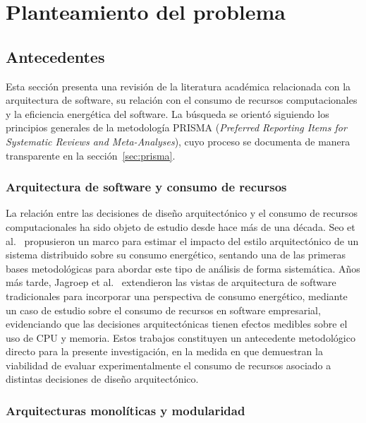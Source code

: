 \chapter{Planteamiento del problema}
\label{cap:planteamiento}

\section{Antecedentes}
\label{sec:antecedentes}

Esta sección presenta una revisión de la literatura académica relacionada con la arquitectura de software, su relación con el consumo de recursos computacionales y la eficiencia energética del software. La búsqueda se orientó siguiendo los principios generales de la metodología PRISMA (\textit{Preferred Reporting Items for Systematic Reviews and Meta-Analyses}), cuyo proceso se documenta de manera transparente en la sección~\ref{sec:prisma}.

\subsection{Arquitectura de software y consumo de recursos}

La relación entre las decisiones de diseño arquitectónico y el consumo de recursos computacionales ha sido objeto de estudio desde hace más de una década. Seo et al.~\cite{seo2008framework} propusieron un marco para estimar el impacto del estilo arquitectónico de un sistema distribuido sobre su consumo energético, sentando una de las primeras bases metodológicas para abordar este tipo de análisis de forma sistemática. Años más tarde, Jagroep et al.~\cite{jagroep2017extending} extendieron las vistas de arquitectura de software tradicionales para incorporar una perspectiva de consumo energético, mediante un caso de estudio sobre el consumo de recursos en software empresarial, evidenciando que las decisiones arquitectónicas tienen efectos medibles sobre el uso de CPU y memoria. Estos trabajos constituyen un antecedente metodológico directo para la presente investigación, en la medida en que demuestran la viabilidad de evaluar experimentalmente el consumo de recursos asociado a distintas decisiones de diseño arquitectónico.

\subsection{Arquitecturas monolíticas y modularidad}

